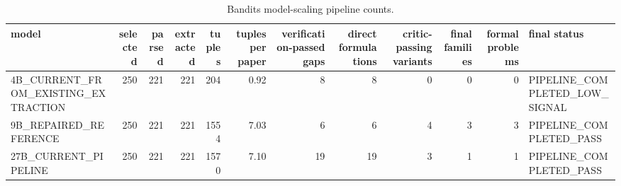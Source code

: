 \begin{table}[htbp]
\centering
\caption{Bandits model-scaling pipeline counts.}
\label{tab:model\_scaling\_counts}
\begin{tabular}{lrrrrrrrrrrl}
\toprule
model & selected & parsed & extracted & tuples & tuples per paper & verification-passed gaps & direct formulations & critic-passing variants & final families & formal problems & final status \\
\midrule
4B\_CURRENT\_FROM\_EXISTING\_EXTRACTION & 250 & 221 & 221 & 204 & 0.92 & 8 & 8 & 0 & 0 & 0 & PIPELINE\_COMPLETED\_LOW\_SIGNAL \\
9B\_REPAIRED\_REFERENCE & 250 & 221 & 221 & 1554 & 7.03 & 6 & 6 & 4 & 3 & 3 & PIPELINE\_COMPLETED\_PASS \\
27B\_CURRENT\_PIPELINE & 250 & 221 & 221 & 1570 & 7.10 & 19 & 19 & 3 & 1 & 1 & PIPELINE\_COMPLETED\_PASS \\
\bottomrule
\end{tabular}
\end{table}
